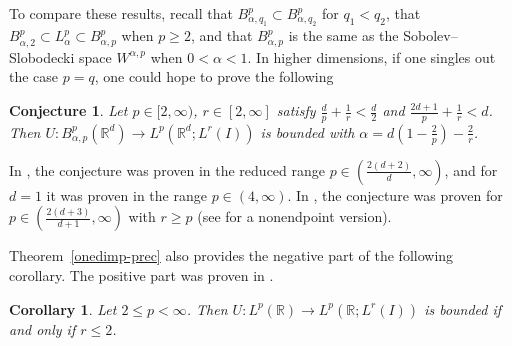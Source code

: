 \documentclass[11pt]{amsart}
\newtheorem{conjecture}[theorem]{Conjecture}
\newtheorem{corollary}[theorem]{Corollary}
\theoremstyle{definition}
\numberwithin{theorem}{section}
\numberwithin{definition}{section}
\numberwithin{equation}{section}
\newcommand{\R}{\mathbb{R}}
\renewcommand{\le}{\leqslant}
\renewcommand{\ge}{\geqslant}
\def\R{\mathbb R}
\def\supp{{\text{\rm supp\,}}}
\def\la{\lambda}             \def\La{\Lambda}
\def\fA{{\mathfrak {A}}}
\def\bbR{{\mathbb {R}}}
\renewcommand{\le}{\leqslant}
\renewcommand{\ge}{\geqslant}
\begin{document}
To compare these results, recall
that
$B^p_{\alpha,q_1}\subset B^p_{\alpha, q_2}$ for  $q_1<q_2$, that
$B^p_{\alpha,2}\subset L^p_\alpha\subset B^p_{\alpha,p}$ when $p\ge 2$, and that $B^p_{\alpha,p}$ is the same as the Sobolev--Slobodecki space
$W^{\alpha,p}$ when $0<\alpha<1$. In higher dimensions, if one singles out
the case  $p=q$,  one could hope to prove  the following
\begin{conjecture}\label{conj} Let $p\in[2,\infty)$, $r\in[2,\infty]$ satisfy
$\frac{d}{p}+\frac{1}{r}<\frac{d}{2}$  and
$\frac{2d+1}{p}+\frac{1}{r}< d$.
 Then $U: B^p_{\alpha,p}(\bbR^d)\to L^p(\R^d;L^r(I))$ is
bounded with $\alpha=d(1-\frac {2}p)-\frac 2r$.
\end{conjecture}

In \cite{lerose}, the conjecture was proven in the reduced range
$p\in(\frac{2(d+2)}{d},\infty)$, and for $d=1$ it was proven in the
range $p\in(4,\infty)$. In \cite{rose}, the conjecture was proven
for $p\in(\frac{2(d+3)}{d+1},\infty)$ with $r\ge p$ (see \cite{ro1}
for a nonendpoint version).
%

Theorem~\ref{onedimp-prec} also provides the negative part of the following corollary. The positive part was proven in \cite[Proposition
5.2]{lerose}.



\begin{corollary}\label{onedim}
Let $2\le p<\infty$.
 Then
$U: L^p(\bbR)\to L^p(\bbR;L^r(I))$
is bounded if and only if $r\le 2$.
\end{corollary}










\end{document}
